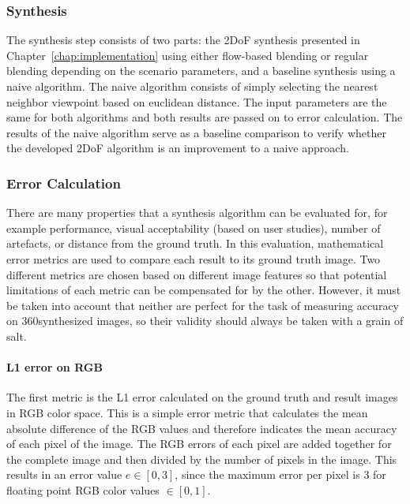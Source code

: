 \subsubsection{Synthesis}
The synthesis step consists of two parts: the 2DoF synthesis presented in Chapter~\ref{chap:implementation} using either flow-based blending or regular blending depending on the scenario parameters, and a baseline synthesis using a naive algorithm.
The naive algorithm consists of simply selecting the nearest neighbor viewpoint based on euclidean distance. The input parameters are the same for both algorithms and both results are passed on to error calculation.
The results of the naive algorithm serve as a baseline comparison to verify whether the developed 2DoF algorithm is an improvement to a naive approach.

\subsubsection{Error Calculation}
There are many properties that a synthesis algorithm can be evaluated for, for example performance, visual acceptability (based on user studies), number of artefacts, or distance from the ground truth. In this evaluation, mathematical
error metrics are used to compare each result to its ground truth image.  Two different metrics are chosen based on different image features so that potential limitations of each metric can be compensated for by the other. However, it must be taken into account that neither are perfect for the task of measuring accuracy on 360\degree synthesized images, so their validity should always be taken with a grain of salt. 

\paragraph{L1 error on RGB}
The first metric is the L1 error calculated on the ground truth and result images in RGB color space. This is a simple error metric that calculates the mean absolute difference of the RGB values and therefore indicates the mean accuracy of each pixel of the image. The RGB errors of each pixel are added together for the complete image and then divided by the number of pixels in the image. This results in an error value $e \in [0,3]$, since the maximum error per pixel is 3 for floating point RGB color values $\in [0,1]$.

